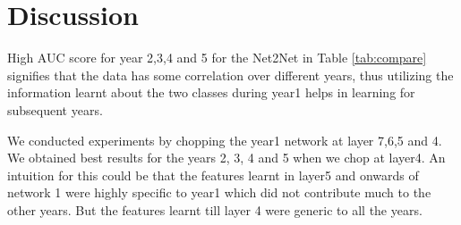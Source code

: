 \section{Discussion}
\label{sec:discuss}

High AUC score for year 2,3,4 and 5 for the Net2Net in Table \ref{tab:compare} signifies that the data has some correlation over different years, thus utilizing the information learnt about the two classes during year1 helps in learning for subsequent years. 

We conducted experiments by chopping the year1 network at layer 7,6,5 and 4. We obtained best results for the years 2, 3, 4 and 5 when we chop at layer4. An intuition for this could be that the features learnt in layer5 and onwards of network 1 were highly specific to year1 which did not contribute much to the other years. But the features learnt till layer 4 were generic to all the years.



